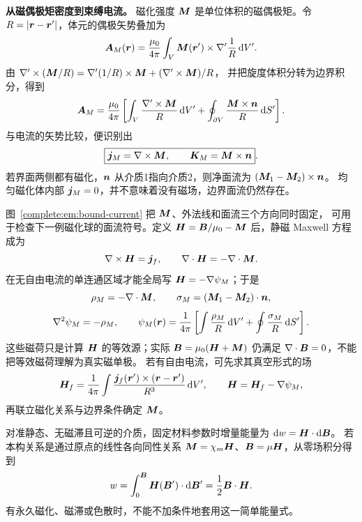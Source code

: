 \noindent\textbf{从磁偶极矩密度到束缚电流。}
磁化强度 $\bm{M}$ 是单位体积的磁偶极矩。令
$R=|\bm{r}-\bm{r}'|$，体元的偶极矢势叠加为
\[
 \bm{A}_M(\bm{r})=\frac{\mu_0}{4\pi}\int_V
 \bm{M}(\bm{r}')\times\nabla'\frac1R\mathop{}\!\mathrm d V'.
\]
由 $\nabla'\times(\bm{M}/R)
=\nabla'(1/R)\times\bm{M}+(\nabla'\times\bm{M})/R$，
并把旋度体积分转为边界积分，得到
\[
 \bm{A}_M=\frac{\mu_0}{4\pi}\left[
 \int_V\frac{\nabla'\times\bm{M}}{R}\mathop{}\!\mathrm d V'
 +\oint_{\partial V}\frac{\bm{M}\times\bm{n}}{R}\mathop{}\!\mathrm d S'\right].
\]
与电流的矢势比较，便识别出
\[
 \boxed{\bm{j}_M=\nabla\times\bm{M},\qquad
 \bm{K}_M=\bm{M}\times\bm{n}}.
\]
若界面两侧都有磁化，$\bm{n}$ 从介质1指向介质2，则净面流为
$(\bm{M}_1-\bm{M}_2)\times\bm{n}$。
均匀磁化体内部 $\bm{j}_M=0$，并不意味着没有磁场，边界面流仍然存在。

\begin{qualityfigure}
\end{qualityfigure}

图~\ref{complete:em:bound-current} 把 $\bm{M}$、外法线和面流三个方向同时固定，
可用于检查下一例磁化球的面流符号。定义
$\bm{H}=\bm{B}/\mu_0-\bm{M}$ 后，静磁 Maxwell 方程成为
\[
 \nabla\times\bm{H}=\bm{j}_f,\qquad
 \nabla\cdot\bm{H}=-\nabla\cdot\bm{M}.
\]
在无自由电流的单连通区域才能全局写 $\bm{H}=-\nabla\psi_M$；于是
\[
 \rho_M=-\nabla\cdot\bm{M},\qquad
 \sigma_M=(\bm{M}_1-\bm{M}_2)\cdot\bm{n},
\]
\[
 \nabla^2\psi_M=-\rho_M,\qquad
 \psi_M(\bm{r})=\frac1{4\pi}\left[
 \int\frac{\rho_M}{R}\mathop{}\!\mathrm d V'+\oint\frac{\sigma_M}{R}\mathop{}\!\mathrm d S'\right].
\]
这些磁荷只是计算 $\bm{H}$ 的等效源；实际 $\bm{B}=\mu_0(\bm{H}+\bm{M})$
仍满足 $\nabla\cdot\bm{B}=0$，不能把等效磁荷理解为真实磁单极。
若有自由电流，可先求其真空形式的场
\[
 \bm{H}_f=\frac1{4\pi}\int
 \frac{\bm{j}_f(\bm{r}')\times(\bm{r}-\bm{r}')}{R^3}\mathop{}\!\mathrm d V',
 \qquad \bm{H}=\bm{H}_f-\nabla\psi_M,
\]
再联立磁化关系与边界条件确定 $\bm{M}$。

对准静态、无磁滞且可逆的介质，固定材料参数时增量能量为
$\mathop{}\!\mathrm d w=\bm{H}\cdot\mathop{}\!\mathrm d\bm{B}$。
若本构关系是通过原点的线性各向同性关系
$\bm{M}=\chi_m\bm{H}$、$\bm{B}=\mu\bm{H}$，从零场积分得到
\[
 w=\int_0^{\bm{B}}\bm{H}(\bm{B}')\cdot\mathop{}\!\mathrm d\bm{B}'
 =\frac12\bm{B}\cdot\bm{H}.
\]
有永久磁化、磁滞或色散时，不能不加条件地套用这一简单能量式。

